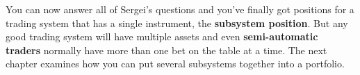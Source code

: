 You can now answer all of Sergei's questions and you've finally got positions for a trading system that has a single instrument, the \textbf{subsystem position}. But any good trading system will have multiple assets and even \textbf{semi-automatic traders} normally have more than one bet on the table at a time. The next chapter examines how you can put several subsystems together into a portfolio.
